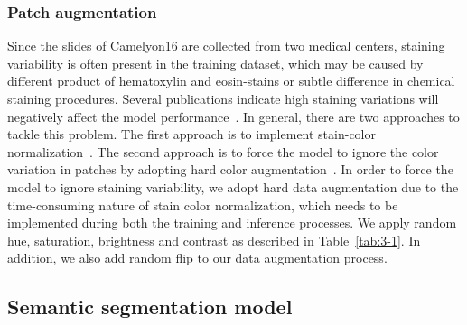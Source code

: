\subsubsection{Patch augmentation}\label{se:3-3.1.2}

Since the slides of Camelyon16 are collected from two medical centers, staining variability is often present in the training dataset, which may be caused by different product of hematoxylin and eosin-stains or subtle difference in chemical staining procedures. Several publications indicate high staining variations will negatively affect the model performance~\cite{Lee2018,Dimitriou2019}. In general, there are two approaches to tackle this problem. The first approach is to implement stain-color normalization~\cite{Magee2009,Zanjani2018}. The second approach is to force the model to ignore the color variation in patches by adopting hard color augmentation~\cite{xu2020colorectal,wu2022machine}. 
In order to force the model to ignore staining variability, we adopt hard data augmentation due to the time-consuming nature of stain color normalization, which needs to be implemented during both the training and inference processes. We apply random hue, saturation, brightness and contrast as described in Table~\ref{tab:3-1}. In addition, we also add random flip to our data augmentation process.

\begin{table}[!h]
\centering
\caption{Patch augmentation details.}
\label{tab:3-1}
\end{table}

\subsection{Semantic segmentation model}\label{se:3-3.2}

